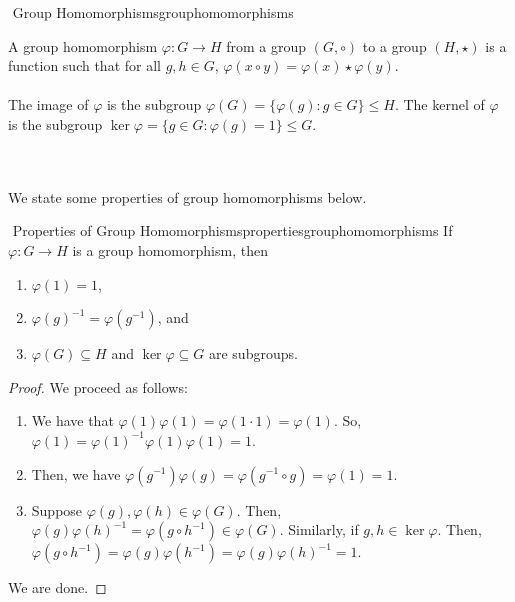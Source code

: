        \begin{definition}{\Stop\,\,Group Homomorphisms}{grouphomomorphisms}

            A group homomorphism \(\varphi:G\to H\) from a group \((G,\circ)\) to a group \((H,\star)\) is a function such that for all \(g,h\in G\), \(\varphi(x\circ y)=\varphi(x)\star\varphi(y)\).
            \\
            \\
            The image of \(\varphi\) is the subgroup \(\varphi(G)=\{\varphi(g):g\in G\}\leq H\). The kernel of \(\varphi\) is the subgroup \(\ker\varphi=\{g\in G: \varphi(g)=1\}\leq G\).
            
        \end{definition}
        \vphantom
        \\
        \\
        We state some properties of group homomorphisms below.
        \begin{proposition}{\Stop\,\,Properties of Group Homomorphisms}{propertiesgrouphomomorphisms}
            If \(\varphi:G\to H\) is a group homomorphism, then
            \begin{enumerate}
                \item \(\varphi(1)=1\),
                \item \(\varphi(g)^{-1}=\varphi(g^{-1})\), and
                \item \(\varphi(G)\subseteq H\) and \(\ker\varphi\subseteq G\) are subgroups.
            \end{enumerate}
            \begin{proof}
                We proceed as follows:
                \begin{enumerate}
                    \item We have that \(\varphi(1)\varphi(1)=\varphi(1\cdot1)=\varphi(1)\). So, \(\varphi(1)=\varphi(1)^{-1}\varphi(1)\varphi(1)=1\).
                    \item Then, we have \(\varphi(g^{-1})\varphi(g)=\varphi(g^{-1}\circ g)=\varphi(1)=1\).
                    \item Suppose \(\varphi(g),\varphi(h)\in\varphi(G)\). Then, \(\varphi(g)\varphi(h)^{-1}=\varphi(g\circ h^{-1})\in\varphi(G)\). Similarly, if \(g,h\in\ker\varphi\). Then, \(\varphi(g\circ h^{-1})=\varphi(g)\varphi(h^{-1})=\varphi(g)\varphi(h)^{-1}=1\).
                \end{enumerate}
                We are done.
            \end{proof}
        \end{proposition}
